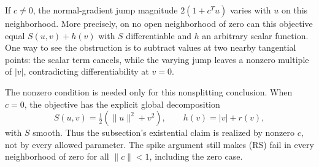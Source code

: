 If $c\ne0$, the normal-gradient jump magnitude $2(1+c^Tu)$ varies with $u$ on this neighborhood. More precisely, on no open neighborhood of zero can this objective equal $S(u,v)+h(v)$ with $S$ differentiable and $h$ an arbitrary scalar function. One way to see the obstruction is to subtract values at two nearby tangential points: the scalar term cancels, while the varying jump leaves a nonzero multiple of $|v|$, contradicting differentiability at $v=0$.

The nonzero condition is needed only for this nonsplitting conclusion. When $c=0$, the objective has the explicit global decomposition
\[
 S(u,v)=\tfrac12(\|u\|^2+v^2),\qquad h(v)=|v|+r(v),
\]
with $S$ smooth. Thus the subsection's existential claim is realized by nonzero $c$, not by every allowed parameter. The spike argument still makes (RS) fail in every neighborhood of zero for all $\|c\|<1$, including the zero case.


\endgroup
